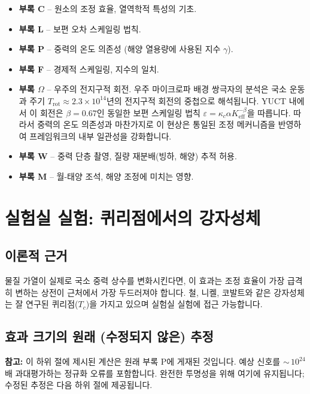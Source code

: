 \documentclass[11pt,a4paper]{article}
\begin{document}
	\begin{itemize}
		\item \textbf{부록 C} – 원소의 조정 효율, 열역학적 특성의 기초.
		\item \textbf{부록 L} – 보편 오차 스케일링 법칙.
		\item \textbf{부록 P} – 중력의 온도 의존성 (해양 열용량에 사용된 지수 $\gamma$).
		\item \textbf{부록 F} – 경제적 스케일링, 지수의 일치.
		\item \textbf{부록 $\Omega$} – 우주의 전지구적 회전. 우주 마이크로파 배경 쌍극자의 분석은 국소 운동과 주기 $T_{\mathrm{rot}} \approx 2.3\times10^{14}$년의 전지구적 회전의 중첩으로 해석됩니다. YUCT 내에서 이 회전은 $\beta = 0.67$인 동일한 보편 스케일링 법칙 $\varepsilon = \kappa_c \alpha K_{\mathrm{eff}}^{-\beta}$을 따릅니다. 따라서 중력의 온도 의존성과 마찬가지로 이 현상은 통일된 조정 메커니즘을 반영하여 프레임워크의 내부 일관성을 강화합니다.
		\item \textbf{부록 W} – 중력 단층 촬영, 질량 재분배(빙하, 해양) 추적 허용.
		\item \textbf{부록 M} – 월-태양 조석, 해양 조정에 미치는 영향.
	\end{itemize}
	
	\section{실험실 실험: 퀴리점에서의 강자성체}
	\label{sec:lab}
	
	\subsection{이론적 근거}
	\label{subsec:lab-rationale}
	
	물질 가열이 실제로 국소 중력 상수를 변화시킨다면, 이 효과는 조정 효율이 가장 급격히 변하는 상전이 근처에서 가장 두드러져야 합니다. 철, 니켈, 코발트와 같은 강자성체는 잘 연구된 퀴리점($T_c$)을 가지고 있으며 실험실 실험에 접근 가능합니다.
	
	\subsection{효과 크기의 원래 (수정되지 않은) 추정}
	\label{subsec:lab-estimate-uncorrected}
	
	\textbf{참고:} 이 하위 절에 제시된 계산은 원래 부록 P에 게재된 것입니다. 예상 신호를 ${\sim}\,10^{24}$ 배 과대평가하는 정규화 오류를 포함합니다. 완전한 투명성을 위해 여기에 유지됩니다; 수정된 추정은 다음 하위 절에 제공됩니다.
	
\end{document}
